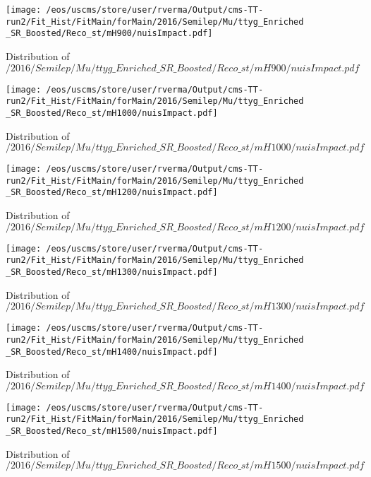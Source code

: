 \begin{figure}
\centering
\texttt{[image: /eos/uscms/store/user/rverma/Output/cms-TT-run2/Fit\_Hist/FitMain/forMain/2016/Semilep/Mu/ttyg\_Enriched\_SR\_Boosted/Reco\_st/mH900/nuisImpact.pdf]}
\caption{Distribution of $/2016/Semilep/Mu/ttyg\_Enriched\_SR\_Boosted/Reco\_st/mH900/nuisImpact.pdf$}
\end{figure}

\begin{figure}
\centering
\texttt{[image: /eos/uscms/store/user/rverma/Output/cms-TT-run2/Fit\_Hist/FitMain/forMain/2016/Semilep/Mu/ttyg\_Enriched\_SR\_Boosted/Reco\_st/mH1000/nuisImpact.pdf]}
\caption{Distribution of $/2016/Semilep/Mu/ttyg\_Enriched\_SR\_Boosted/Reco\_st/mH1000/nuisImpact.pdf$}
\end{figure}

\begin{figure}
\centering
\texttt{[image: /eos/uscms/store/user/rverma/Output/cms-TT-run2/Fit\_Hist/FitMain/forMain/2016/Semilep/Mu/ttyg\_Enriched\_SR\_Boosted/Reco\_st/mH1200/nuisImpact.pdf]}
\caption{Distribution of $/2016/Semilep/Mu/ttyg\_Enriched\_SR\_Boosted/Reco\_st/mH1200/nuisImpact.pdf$}
\end{figure}

\begin{figure}
\centering
\texttt{[image: /eos/uscms/store/user/rverma/Output/cms-TT-run2/Fit\_Hist/FitMain/forMain/2016/Semilep/Mu/ttyg\_Enriched\_SR\_Boosted/Reco\_st/mH1300/nuisImpact.pdf]}
\caption{Distribution of $/2016/Semilep/Mu/ttyg\_Enriched\_SR\_Boosted/Reco\_st/mH1300/nuisImpact.pdf$}
\end{figure}

\begin{figure}
\centering
\texttt{[image: /eos/uscms/store/user/rverma/Output/cms-TT-run2/Fit\_Hist/FitMain/forMain/2016/Semilep/Mu/ttyg\_Enriched\_SR\_Boosted/Reco\_st/mH1400/nuisImpact.pdf]}
\caption{Distribution of $/2016/Semilep/Mu/ttyg\_Enriched\_SR\_Boosted/Reco\_st/mH1400/nuisImpact.pdf$}
\end{figure}

\begin{figure}
\centering
\texttt{[image: /eos/uscms/store/user/rverma/Output/cms-TT-run2/Fit\_Hist/FitMain/forMain/2016/Semilep/Mu/ttyg\_Enriched\_SR\_Boosted/Reco\_st/mH1500/nuisImpact.pdf]}
\caption{Distribution of $/2016/Semilep/Mu/ttyg\_Enriched\_SR\_Boosted/Reco\_st/mH1500/nuisImpact.pdf$}
\end{figure}

